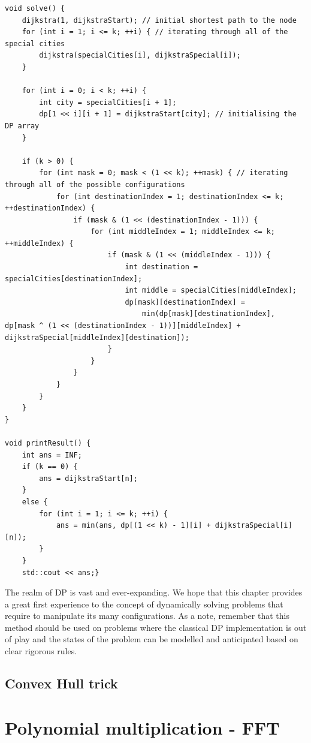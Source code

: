 \documentclass[letterpaper]{article}
\begin{document}
\begin{lstlisting}
void solve() {
    dijkstra(1, dijkstraStart); // initial shortest path to the node
    for (int i = 1; i <= k; ++i) { // iterating through all of the special cities
        dijkstra(specialCities[i], dijkstraSpecial[i]);
    }

    for (int i = 0; i < k; ++i) {
        int city = specialCities[i + 1];
        dp[1 << i][i + 1] = dijkstraStart[city]; // initialising the DP array
    }

    if (k > 0) {
        for (int mask = 0; mask < (1 << k); ++mask) { // iterating through all of the possible configurations
            for (int destinationIndex = 1; destinationIndex <= k; ++destinationIndex) {
                if (mask & (1 << (destinationIndex - 1))) {
                    for (int middleIndex = 1; middleIndex <= k; ++middleIndex) {
                        if (mask & (1 << (middleIndex - 1))) {
                            int destination = specialCities[destinationIndex];
                            int middle = specialCities[middleIndex];
                            dp[mask][destinationIndex] =
                                min(dp[mask][destinationIndex], dp[mask ^ (1 << (destinationIndex - 1))][middleIndex] + dijkstraSpecial[middleIndex][destination]);
                        }
                    }
                }
            }
        }
    }
}

void printResult() {
    int ans = INF;
    if (k == 0) {
        ans = dijkstraStart[n];
    }
    else {
        for (int i = 1; i <= k; ++i) {
            ans = min(ans, dp[(1 << k) - 1][i] + dijkstraSpecial[i][n]);
        }
    }
    std::cout << ans;}
\end{lstlisting}

The realm of DP is vast and ever-expanding. We hope that this chapter provides a great first experience to the concept of dynamically solving problems that require to manipulate its many configurations. As a note, remember that this method should be used on problems where the classical DP implementation is out of play and the states of the problem can be modelled and anticipated based on clear rigorous rules.

\newpage

\subsection{Convex Hull trick}

\newpage

\section{Polynomial multiplication - FFT}
\end{document}
